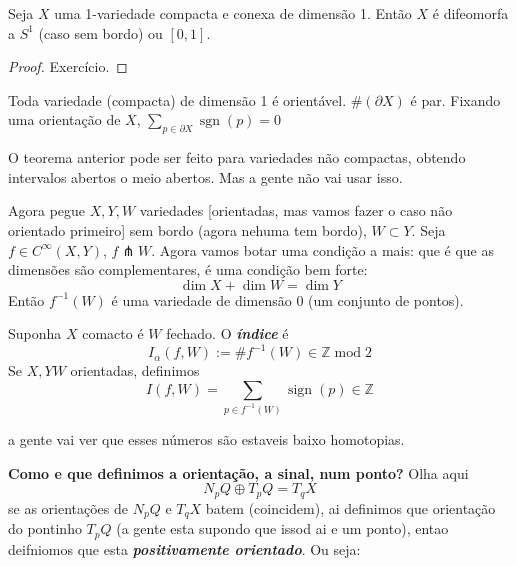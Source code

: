 \begin{thm}\leavevmode
	Seja \(X\) uma 1-variedade compacta e conexa de dimensão 1. Então \(X\) é difeomorfa a \(S^1\) (caso sem bordo) ou \([0,1]\).
\end{thm}

\begin{proof}\leavevmode
Exercício.
\end{proof}

\begin{coro}\leavevmode
Toda variedade (compacta) de dimensão 1 é orientável. \(\# (\partial X)\) é par. Fixando uma orientação de \(X\), \(\sum_{p \in \partial X}\operatorname{sgn}(p)=0\)
\end{coro}

\begin{remark}\leavevmode
O teorema anterior pode ser feito para variedades não compactas, obtendo intervalos abertos o meio abertos. Mas a gente não vai usar isso.
\end{remark}

Agora pegue \(X,Y,W\) variedades [orientadas, mas vamos fazer o caso não orientado primeiro] sem bordo (agora nehuma tem bordo), \(W \subset Y\). Seja \(f \in C^\infty (X,Y)\), \(f \pitchfork  W\). Agora vamos botar uma condição a mais: que é  que as dimensões são complementares, é uma condição bem forte:
\[\dim X+ \dim W=\dim Y\]
Então \(f^{-1}(W)\) é uma variedade de dimensão 0 (um conjunto de pontos).

\begin{defn}\leavevmode
Suponha \(X\) comacto é \(W\) fechado.	O \textit{\textbf{índice}} é 
	\[I_\alpha(f,W) := \# f^{-1}(W) \in \mathbb{Z} \operatorname{ mod}2\]
Se \(X, Y W \) orientadas, definimos
\[I(f,W) = \sum _{p \in f^{-1}(W)}\operatorname{sign}(p) \in \mathbb{Z}\]

\end{defn}

a gente vai ver que esses números são estaveis baixo homotopias.

\textbf{Como e que definimos a orientação, a sinal, num ponto?} Olha aqui
\[N_pQ \oplus  T_p Q= T_qX\]
se as orientações de \(N_pQ\) e \(T_qX\) batem (coincidem), ai definimos que orientação do pontinho \(T_pQ\) (a gente esta supondo que issod ai e um ponto), entao deifniomos que esta  \textit{\textbf{positivamente orientado}}. Ou seja:

